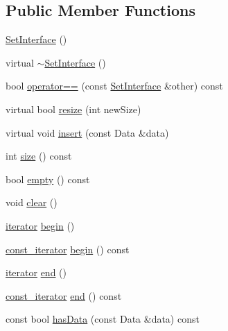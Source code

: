 \subsection*{Public Member Functions}
\begin{CompactItemize}
\item 
\hyperlink{class_j_g_t_l_1_1_set_interface_fd2b06e95eef00ac46b778e1c96a13e4}{Set\-Interface} ()
\item 
virtual \hyperlink{class_j_g_t_l_1_1_set_interface_bf1ec172c20daa413de2a36764454245}{$\sim$Set\-Interface} ()
\item 
bool \hyperlink{class_j_g_t_l_1_1_set_interface_1c8272ceef57740200d7080b5b5ae2e4}{operator==} (const \hyperlink{class_j_g_t_l_1_1_set_interface}{Set\-Interface} \&other) const 
\item 
virtual bool \hyperlink{class_j_g_t_l_1_1_set_interface_136d868ffd3695632c16e4f88b84352b}{resize} (int new\-Size)
\item 
virtual void \hyperlink{class_j_g_t_l_1_1_set_interface_e49dab84e130a87f82f05f77d065508a}{insert} (const Data \&data)
\item 
int \hyperlink{class_j_g_t_l_1_1_set_interface_a3929a2e9a3ef83cd20b6c4d6470c207}{size} () const
\item 
bool \hyperlink{class_j_g_t_l_1_1_set_interface_3d41a7f025824693499be8a252460dc5}{empty} () const
\item 
void \hyperlink{class_j_g_t_l_1_1_set_interface_62ad8783677fdbfdca6e133574c384de}{clear} ()
\item 
\hyperlink{class_j_g_t_l_1_1_set_interface_1f4b953e9a9adb5d463b6abb24623372}{iterator} \hyperlink{class_j_g_t_l_1_1_set_interface_d00e33172d553f527abdb53795fbe9da}{begin} ()
\item 
\hyperlink{class_j_g_t_l_1_1_set_interface_1e545e77790db36de24904dc70054225}{const\_\-iterator} \hyperlink{class_j_g_t_l_1_1_set_interface_cffbe1ad98d710b21c676f146359884c}{begin} () const
\item 
\hyperlink{class_j_g_t_l_1_1_set_interface_1f4b953e9a9adb5d463b6abb24623372}{iterator} \hyperlink{class_j_g_t_l_1_1_set_interface_0d17cba0219448c6119c31374b983e76}{end} ()
\item 
\hyperlink{class_j_g_t_l_1_1_set_interface_1e545e77790db36de24904dc70054225}{const\_\-iterator} \hyperlink{class_j_g_t_l_1_1_set_interface_6675901f9ae1bb5c35bd45d33bb22a12}{end} () const
\item 
const bool \hyperlink{class_j_g_t_l_1_1_set_interface_8dbec0353ff7027964473366508a417d}{has\-Data} (const Data \&data) const 

\end{CompactItemize}
